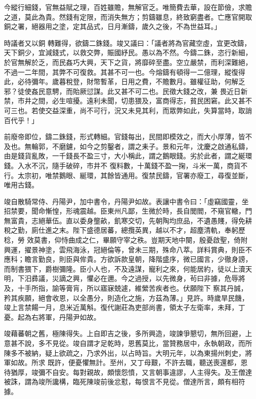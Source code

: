 \begin{pinyinscope}
 今縱行細錢，官無益賦之理，百姓雖贍，無解官乏。唯簡費去華，設在節儉，求贍之道，莫此為貴。然錢有定限，而消失無方；剪鑄雖息，終致窮盡者。亡應官開取銅之署，絕器用之塗，定其品式，日月漸鑄，歲久之後，不為世益耳。」



 時議者又以銅
 轉難得，欲鑄二銖錢。竣又議曰：「議者將為官藏空虛，宜更改鑄，天下銅少，宜減錢式，以救交弊，賑國紓民。愚以為不然。今鑄二銖，恣行新細，於官無解於乏，而民姦巧大興，天下之貨，將靡碎至盡。空立嚴禁，而利深難絕，不過一二年間，其弊不可復救。其甚不可一也。今熔鑄有頓得一二億理，縱復得此，必待彌年。歲暮稅登，財幣暫革，日用之費，不贍數月。雖權征助，何解乏邪？徒使姦民意騁，而貽厥愆謀。此又甚不可二也。民徵大錢之改，兼
 畏近日新禁，市井之間，必生喧擾。遠利未聞，切患猥及，富商得志，貧民困窘。此又甚不可三也。若使交益深重，尚不可行，況又未見其利，而眾弊如此，失算當時，取誚百代乎！」



 前廢帝即位，鑄二銖錢，形式轉細。官錢每出，民間即模效之，而大小厚薄，皆不及也。無輪郭，不磨鑢，如今之剪鑿者，謂之耒子。景和元年，沈慶之啟通私鑄，由是錢貨亂敗，一千錢長不盈三寸，大小稱此，謂之鵝眼錢。劣於此者，謂之綖環錢。入水不沉，隨手破碎，市井不
 復料數，十萬錢不盈一掬，斗米一萬，商貨不行。太宗初，唯禁鵝眼、綖環，其餘皆通用。復禁民鑄，官署亦廢工，尋復並斷，唯用古錢。



 竣自散騎常侍、丹陽尹，加中書令，丹陽尹如故。表讓中書令曰：「虛竊國靈，坐招禁要，聞命慚惶，形魂震越。臣東州凡鄙，生微於時，長自閭閻，不窺官轍，門無富貴，志絕華伍。直以委身壟畝，飢寒交切，先朝陶均庶品，不遺愚賤，得免耕稅之勤，廁仕進之末。陛下盛德居蕃，總攬英異，越以不才，超塵清軌，奉躬歷稔，勞
 效莫書，仰恃曲成之仁，畢願守宰之秩。豈期天地中闋，殷憂啟聖，倚附興運，擢景神塗，雲飛海泳，冠絕倫等，曾未三期，殊命八萃。詳料賞典，則臣不應科；瞻言勤良，則臣與侔貴。方欲訴款皇朝，降階盛序，微已國言，少徹身謗，而制書猥下，爵樹彌隆。臣小人也，不及遠謀，寵利之來，何能居約，徒以上瀆天明，下汨彞議，災謫之興，懼必在邇。今之過授，以先微身，茍曰非據，危辱將及，十手所指，諭等膏肓，所以寤寐兢遽，維縈苦疾者也。伏願陛下
 察其丹誠，矜其疾願，絕會收恩，以全愚分，則造化之施，方茲為薄。」見許。時歲旱民饑，竣上言禁餳一月，息米近萬斛。復代謝莊為吏部尚書，領太子左衛率，未拜，丁憂。起為右將軍，丹陽尹如故。



 竣藉蕃朝之舊，極陳得失。上自即吉之後，多所興造，竣諫爭懇切，無所回避，上意甚不說，多不見從。竣自謂才足乾時，恩舊莫比，當贊務居中，永執朝政，而所陳多不被納，疑上欲疏之，乃求外出，以占時旨。大明元年，以為東揚州刺史，將軍如故。所求
 既許，便憂懼無計。至州，又丁母艱，不許去職，聽送喪還都，恩待猶厚，竣彌不自安。每對親故，頗懷怨憤，又言朝事違謬，人主得失。及王僧達被誅，謂為竣所讒構，臨死陳竣前後忿懟，每恨言不見從。僧達所言，頗有相符據。




\end{pinyinscope}
